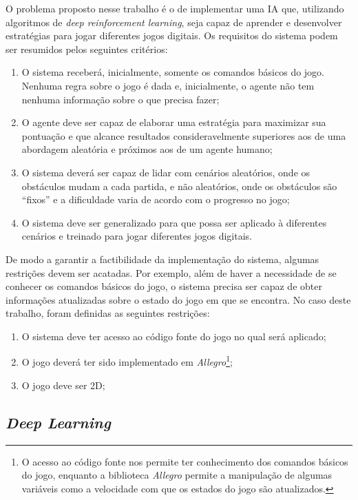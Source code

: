  O problema proposto nesse trabalho é o de implementar uma IA que, utilizando algoritmos de \textit{deep reinforcement learning}, seja capaz de aprender e desenvolver estratégias para jogar diferentes jogos digitais. Os requisitos do sistema podem ser resumidos pelos seguintes critérios:
\begin{enumerate}
	\item O sistema receberá, inicialmente, somente os comandos básicos do jogo. Nenhuma regra sobre o jogo é dada e, inicialmente, o agente não tem nenhuma informação sobre o que precisa fazer;
	\item O agente deve ser capaz de elaborar uma estratégia para maximizar sua pontuação e que alcance resultados consideravelmente superiores aos de uma abordagem aleatória e próximos aos de um agente humano;
	\item O sistema deverá ser capaz de lidar com cenários aleatórios, onde os obstáculos mudam a cada partida, e não aleatórios, onde os obstáculos são ``fixos'' e a dificuldade varia de acordo com o progresso no jogo;
	\item O sistema deve ser generalizado para que possa ser aplicado à diferentes cenários e treinado para jogar diferentes jogos digitais.
\end{enumerate}

De modo a garantir a factibilidade da implementação do sistema, algumas restrições devem ser acatadas. Por exemplo, além de haver a necessidade de se conhecer os comandos básicos do jogo, o sistema precisa ser capaz de obter informações atualizadas sobre o estado do jogo em que se encontra. No caso deste trabalho, foram definidas as seguintes restrições:

\begin{enumerate}
	\item O sistema deve ter acesso ao código fonte do jogo no qual será aplicado;
	\item O jogo deverá ter sido implementado em \textit{Allegro}\footnote{O acesso ao código fonte nos permite ter conhecimento dos comandos básicos do jogo, enquanto a biblioteca \textit{Allegro} permite a manipulação de algumas variáveis como a velocidade com que os estados do jogo são atualizados.};
	\item O jogo deve ser 2D;
\end{enumerate}



\subsection{\textit{Deep Learning}}


